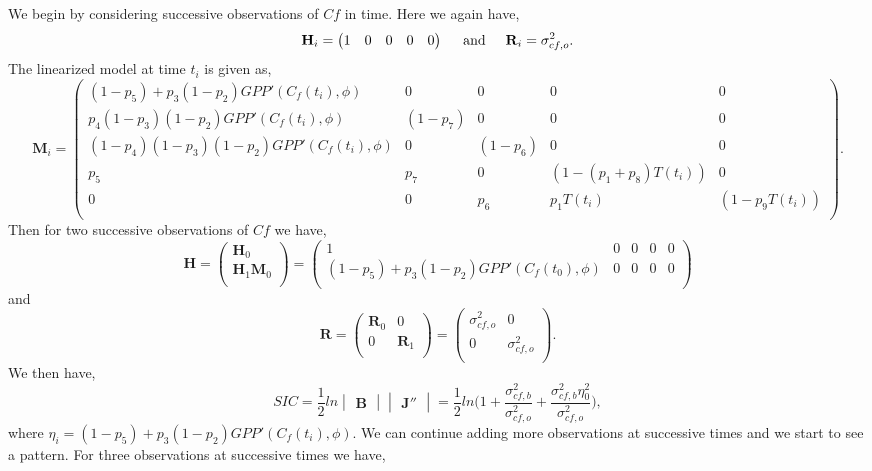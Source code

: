 \documentclass[11pt]{article}
\begin{document}
We begin by considering successive observations of $Cf$ in time. Here we again have,
\[
\mathbf{H}_{i} = \begin{pmatrix}
1 & 0 & 0 & 0 & 0
\end{pmatrix}
\hspace{5mm} \text{and} \hspace{5mm}
\mathbf{R}_i=\sigma_{cf,o}^{2}.
\] 
The linearized model at time $t_i$ is given as,
\[
\mathbf{M}_{i}=
\begin{pmatrix} 
(1-p_5)+p_3(1-p_2)GPP'(C_f(t_i),\phi) & 0 & 0 & 0 & 0 \\
p_4(1-p_3)(1-p_2)GPP'(C_f(t_i),\phi) & (1-p_7) & 0 & 0 & 0 \\
(1-p_4)(1-p_3)(1-p_2)GPP'(C_f(t_i),\phi) & 0 & (1-p_6) & 0 & 0 \\
p_5 & p_7 & 0 & (1-(p_1+p_8)T(t_i)) & 0 \\
0 & 0 & p_6 & p_1T(t_i) & (1-p_9T(t_i)) \\
\end{pmatrix}.
\]
Then for two successive observations of $Cf$ we have,
\[ 
\mathbf{H}=
\begin{pmatrix}
\mathbf{H}_0 \\
\mathbf{H}_1\mathbf{M}_0\\
\end{pmatrix}
=
\begin{pmatrix}
1 & 0 & 0 & 0 & 0 \\
(1-p_5)+p_3(1-p_2)GPP'(C_f(t_0),\phi) & 0 & 0 & 0 & 0\\
\end{pmatrix}
\]
and
\[
\mathbf{R}=
\begin{pmatrix}
\mathbf{R}_0 & 0  \\
0 & \mathbf{R}_1  \\
\end{pmatrix}
=
\begin{pmatrix}
\sigma_{cf,o}^{2} & 0  \\
0 & \sigma_{cf,o}^{2}  \\
\end{pmatrix}.
\]
We then have,
\[
SIC = \frac{1}{2}ln\begin{vmatrix} \mathbf{B} \end{vmatrix}\begin{vmatrix} \mathbf{J}'' \end{vmatrix} =\frac{1}{2}ln \bigg(1+\frac{\sigma_{cf,b}^{2}}{\sigma_{cf,o}^{2}}+\frac{\sigma_{cf,b}^{2}\eta_0^{2}}{\sigma_{cf,o}^{2}} \bigg),
\]
where $\eta_i=(1-p_5)+p_3(1-p_2)GPP'(C_f(t_i),\phi)$. We can continue adding more observations at successive times and we start to see a pattern. For three observations at successive times we have,
\end{document}
